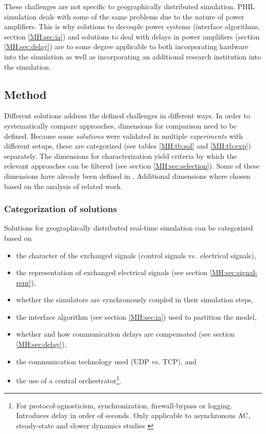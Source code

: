 \documentclass[a4paper]{atseminar}
\begin{document}
These challenges are not specific to geographically distributed simulation. PHIL simulation deals with some of the same problems due to the nature of power amplifiers. This is why solutions to decouple power systems (interface algorithms, section \ref{MH:sec:ia}) and solutions to deal with delays in power amplifiers (section \ref{MH:sec:delay}) are to some degree applicable to both incorporating hardware into the simulation as well as incorporating an additional research institution into the simulation.

\subsection{Method}
\label{MH:sec:method}

Different solutions address the defined challenges in different ways. In order to systematically compare approaches, dimensions for comparison need to be defined. Because some \textit{solutions} were validated in multiple \textit{experiments} with different setups, these are categorized (see tables \ref{MH:tb:sol} and \ref{MH:tb:exp}) separately. The dimensions for characterization yield criteria by which the relevant approaches can be filtered (see section \ref{MH:sec:selection}). Some of these dimensions have already been defined in \cite{syed2020standard}. Additional dimensions where chosen based on the analysis of related work.

\subsubsection{Categorization of solutions}
\label{MH:sec:cat-sol}

Solutions for geographically distributed real-time simulation can be categorized based on

\begin{itemize}
    
    \item the character of the exchanged signals (control signals vs.~electrical signals),
    \item the representation of exchanged electrical signals (see section \ref{MH:sec:signal-repr}),
    \item whether the simulators are synchronously coupled in their simulation steps,
    \item the interface algorithm (see section \ref{MH:sec:ia}) used to partition the model,
    \item whether and how communication delays are compensated (see section \ref{MH:sec:delay}), 
    \item the communication technology used (UDP vs. TCP), and %
    \item the use of a central orchestrator\footnote{For protocol-agnosticism, synchronization, firewall-bypass or logging. Introduces delay in order of seconds. Only applicable to asynchronous AC, steady-state and slower dynamics studies \cite{syed2020standard}}.

\end{itemize}
\end{document}
